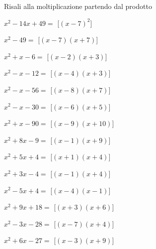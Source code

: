 \begin{esercizio}
 \label{ese:11.11}
Risali alla moltiplicazione partendo dal prodotto

\begin{multicols}{2}
\begin{enumeratea}
\spazielenx
\item \(x^{2} - 14 x + 49=\) 
\hfill [\(\left(x - 7\right)^{2}\)]
\item \(x^{2} - 49=\) 
\hfill [\(\left(x - 7\right) \left(x + 7\right)\)]
\item \(x^{2} + x - 6=\) 
\hfill [\(\left(x - 2\right) \left(x + 3\right)\)]
\item \(x^{2} - x - 12=\) 
\hfill [\(\left(x - 4\right) \left(x + 3\right)\)]
\item \(x^{2} - x - 56=\) 
\hfill [\(\left(x - 8\right) \left(x + 7\right)\)]
\item \(x^{2} - x - 30=\) 
\hfill [\(\left(x - 6\right) \left(x + 5\right)\)]
\item \(x^{2} + x - 90=\) 
\hfill [\(\left(x - 9\right) \left(x + 10\right)\)]
\item \(x^{2} + 8 x - 9=\) 
\hfill [\(\left(x - 1\right) \left(x + 9\right)\)]
\item \(x^{2} + 5 x + 4=\) 
\hfill [\(\left(x + 1\right) \left(x + 4\right)\)]
\item \(x^{2} + 3 x - 4=\) 
\hfill [\(\left(x - 1\right) \left(x + 4\right)\)]
\item \(x^{2} - 5 x + 4=\) 
\hfill [\(\left(x - 4\right) \left(x - 1\right)\)]
\item \(x^{2} + 9 x + 18=\) 
\hfill [\(\left(x + 3\right) \left(x + 6\right)\)]
\item \(x^{2} - 3 x - 28=\) 
\hfill [\(\left(x - 7\right) \left(x + 4\right)\)]
\item \(x^{2} + 6 x - 27=\) 
\hfill [\(\left(x - 3\right) \left(x + 9\right)\)]

\end{enumeratea}
\end{multicols}
\end{esercizio}

